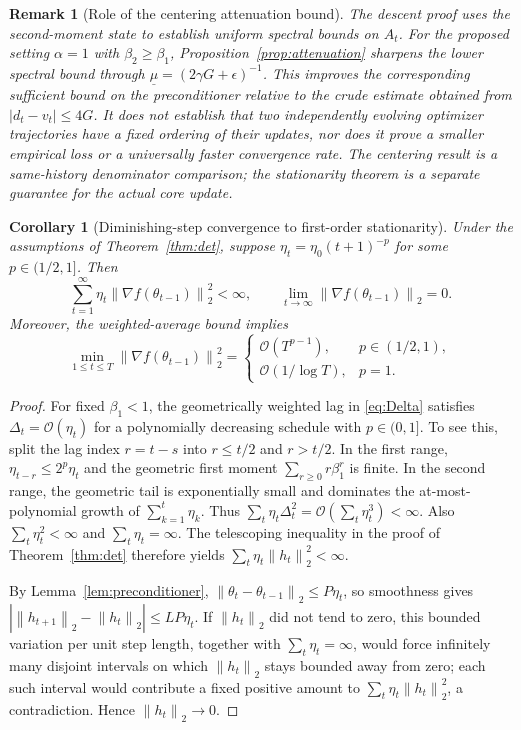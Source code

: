 \documentclass[11pt]{article}
\newtheorem{corollary}[theorem]{Corollary}
\newtheorem{remark}[theorem]{Remark}
\newcommand{\norm}[1]{\left\lVert #1\right\rVert}
\newcommand{\cO}{\mathcal{O}}
\begin{document}
\begin{remark}[Role of the centering attenuation bound]
The descent proof uses the second-moment state to establish uniform spectral bounds on $A_t$. For the proposed setting $\alpha=1$ with $\beta_2\geq\beta_1$, Proposition~\ref{prop:attenuation} sharpens the lower spectral bound through $\underline\mu=(2\gamma G+\epsilon)^{-1}$. This improves the corresponding sufficient bound on the preconditioner relative to the crude estimate obtained from $|d_t-v_t|\leq4G$. It does not establish that two independently evolving optimizer trajectories have a fixed ordering of their updates, nor does it prove a smaller empirical loss or a universally faster convergence rate. The centering result is a same-history denominator comparison; the stationarity theorem is a separate guarantee for the actual core update.
\end{remark}

\begin{corollary}[Diminishing-step convergence to first-order stationarity]\label{cor:diminishing}
Under the assumptions of Theorem~\ref{thm:det}, suppose $\eta_t=\eta_0(t+1)^{-p}$ for some $p\in(1/2,1]$. Then
\[
 \sum_{t=1}^{\infty}\eta_t\norm{\nabla f(\theta_{t-1})}_2^2<\infty,
 \qquad
 \lim_{t\to\infty}\norm{\nabla f(\theta_{t-1})}_2=0.
\]
Moreover, the weighted-average bound implies
\[
 \min_{1\le t\le T}\norm{\nabla f(\theta_{t-1})}_2^2
 =\begin{cases}
 \cO(T^{p-1}),&p\in(1/2,1),\\
 \cO(1/\log T),&p=1.
 \end{cases}
\]
\end{corollary}

\begin{proof}
For fixed $\beta_1<1$, the geometrically weighted lag in \eqref{eq:Delta} satisfies $\Delta_t=\cO(\eta_t)$ for a polynomially decreasing schedule with $p\in(0,1]$. To see this, split the lag index $r=t-s$ into $r\le t/2$ and $r>t/2$. In the first range, $\eta_{t-r}\le 2^p\eta_t$ and the geometric first moment $\sum_{r\ge0}r\beta_1^r$ is finite. In the second range, the geometric tail is exponentially small and dominates the at-most-polynomial growth of $\sum_{k=1}^t\eta_k$. Thus $\sum_t\eta_t\Delta_t^2=\cO(\sum_t\eta_t^3)<\infty$. Also $\sum_t\eta_t^2<\infty$ and $\sum_t\eta_t=\infty$. The telescoping inequality in the proof of Theorem~\ref{thm:det} therefore yields $\sum_t\eta_t\norm{h_t}_2^2<\infty$.

By Lemma~\ref{lem:preconditioner}, $\norm{\theta_t-\theta_{t-1}}_2\le P\eta_t$, so smoothness gives
$|\norm{h_{t+1}}_2-\norm{h_t}_2|\le LP\eta_t$. If $\norm{h_t}_2$ did not tend to zero, this bounded variation per unit step length, together with $\sum_t\eta_t=\infty$, would force infinitely many disjoint intervals on which $\norm{h_t}_2$ stays bounded away from zero; each such interval would contribute a fixed positive amount to $\sum_t\eta_t\norm{h_t}_2^2$, a contradiction. Hence $\norm{h_t}_2\to0$.
\end{proof}
\end{document}
